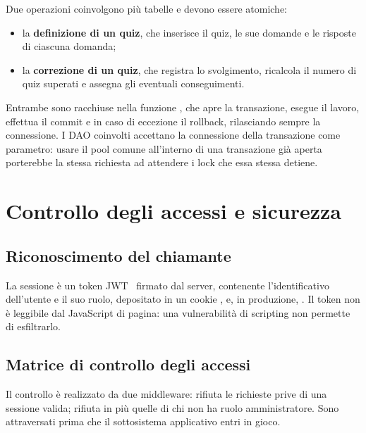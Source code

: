 Due operazioni coinvolgono più tabelle e devono essere atomiche:

\begin{itemize}
  \item la \textbf{definizione di un quiz}, che inserisce il quiz, le sue
        domande e le risposte di ciascuna domanda;
  \item la \textbf{correzione di un quiz}, che registra lo svolgimento,
        ricalcola il numero di quiz superati e assegna gli eventuali
        conseguimenti.
\end{itemize}

Entrambe sono racchiuse nella funzione , che apre la
transazione, esegue il lavoro, effettua il commit e in caso di eccezione il
rollback, rilasciando sempre la connessione. I DAO coinvolti accettano la
connessione della transazione come parametro: usare il pool comune
all'interno di una transazione già aperta porterebbe la stessa richiesta ad
attendere i lock che essa stessa detiene.


\section{Controllo degli accessi e sicurezza}
\label{sec:sdd-accessi}

\subsection{Riconoscimento del chiamante}

La sessione è un token JWT~\cite{rfc7519} firmato dal server, contenente
l'identificativo dell'utente e il suo ruolo, depositato in un cookie
,  e, in produzione, . Il token non
è leggibile dal JavaScript di pagina: una vulnerabilità di scripting non
permette di esfiltrarlo.


\subsection{Matrice di controllo degli accessi}

Il controllo è realizzato da due middleware:  rifiuta le
richieste prive di una sessione valida;  rifiuta in più
quelle di chi non ha ruolo amministratore. Sono attraversati prima che il
sottosistema applicativo entri in gioco.

